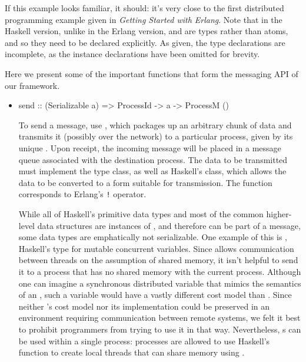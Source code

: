 \documentclass[preprint]{sigplanconf}
\begin{document}
If this example looks familiar, it should: it's very close to the first distributed programming example given in {\em Getting Started with Erlang}. Note that in the Haskell version, unlike in the Erlang version,  and  are types rather than atoms, and so they need to be declared explicitly. As given, the type declarations are incomplete, as the instance declarations have been omitted for brevity.

Here we present some of the important functions that form the messaging API of our framework.

\begin{itemize}
\item 
\begin{code}
send :: (Serializable a) => ProcessId -> a -> ProcessM ()
\end{code}

To send a message, use , which packages up an arbitrary chunk of data and transmits it (possibly over the network) to a particular process, given by its unique . Upon receipt, the incoming message will be placed in a message queue associated with the destination process. The data to be transmitted must implement the  type class, as well as Haskell's  class, which allows the data to be converted to a form suitable for transmission. The  function corresponds to Erlang's \texttt{!} operator.

While all of Haskell's primitive data types and most of the common higher-level data structures are instances of , and therefore can be part of a message, some data types are emphatically not serializable. One example of this is , Haskell's type for mutable concurrent variables. Since  allows communication between threads on the assumption of shared memory, it isn't helpful to send it to a process that has no shared memory with the current process. Although one can imagine a synchronous distributed variable that mimics the semantics of an , such a variable would have a vastly different cost model than . Since neither 's cost model nor its implementation could be preserved in an environment requiring communication between remote systems, we felt it best to prohibit programmers from trying to use it in that way. Nevertheless, s can be used within a single process: processes are allowed to use Haskell's  function to create local threads that can share memory using .


\end{itemize}
\end{document}
